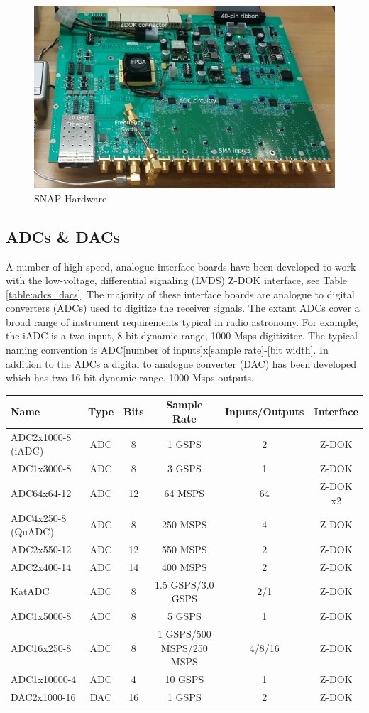 \documentclass{ws-jai}
\begin{document}
\begin{figure}[h]
\centering
\includegraphics[width=150mm, scale=0.5]{snap_hw}
\caption{SNAP Hardware}
\label{fig:snap_hw}
\end{figure}

\subsection{ADCs \& DACs}

A number of high-speed, analogue interface boards have been developed to work
with the low-voltage, differential signaling (LVDS) Z-DOK interface, see Table
\ref{table:adcs_dacs}. The majority of these interface boards are analogue to
digital converters (ADCs) used to digitize the receiver signals. The extant ADCs
cover a broad range of instrument requirements typical in radio
astronomy. For example, the iADC is a two input, 8-bit dynamic range, 1000 Msps
digitiziter. The typical naming convention is ADC[number of inputs]x[sample
rate]-[bit width]. In addition to the ADCs a digital to analogue converter (DAC)
has been developed which has two 16-bit dynamic range, 1000 Msps outputs.

\begin{tabular}{lccccc}
\label{table:adcs_dacs}
Name & Type & Bits & Sample Rate & Inputs/Outputs & Interface \\
\hline
ADC2x1000-8 (iADC) & ADC & 8 & 1 GSPS & 2 & Z-DOK \\
ADC1x3000-8 & ADC & 8 & 3 GSPS & 1 & Z-DOK \\
ADC64x64-12 & ADC & 12 & 64 MSPS & 64 & Z-DOK x2 \\
ADC4x250-8 (QuADC) & ADC & 8 & 250 MSPS & 4 & Z-DOK \\
ADC2x550-12 & ADC & 12 & 550 MSPS & 2 & Z-DOK \\
ADC2x400-14 & ADC & 14 & 400 MSPS & 2 & Z-DOK \\
KatADC & ADC & 8 & 1.5 GSPS/3.0 GSPS & 2/1 & Z-DOK \\
ADC1x5000-8 & ADC & 8 & 5 GSPS & 1 & Z-DOK \\
ADC16x250-8 & ADC & 8 & 1 GSPS/500 MSPS/250 MSPS & 4/8/16 & Z-DOK \\
ADC1x10000-4 & ADC & 4 & 10 GSPS & 1 & Z-DOK \\
DAC2x1000-16 & DAC & 16 & 1 GSPS & 2 & Z-DOK \\
\end{tabular}
\end{document}
